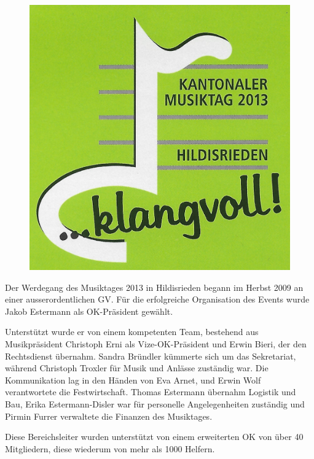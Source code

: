 \begin{history}

    \begin{figure}
        \includegraphics[width=\linewidth]{./chap/2001-2024/2013/Musiktag-Logo.jpg}
    \end{figure}

    Der Werdegang des Musiktages 2013 in Hildisrieden begann im Herbst 2009 an
    einer ausserordentlichen GV. Für die erfolgreiche Organisation des Events
    wurde \mbox{Jakob} \mbox{Estermann} als OK-Präsident gewählt.

    Unterstützt wurde er von einem kompetenten Team, bestehend aus
    Musikpräsident Christoph Erni als Vize-OK-Präsident und Erwin Bieri, der den
    Rechtsdienst übernahm. Sandra Bründler kümmerte sich um das Sekretariat,
    während Christoph Troxler für Musik und Anlässe zuständig war. Die
    Kommunikation lag in den Händen von Eva Arnet, und Erwin Wolf verantwortete
    die Festwirtschaft. Thomas Estermann übernahm Logistik und Bau, Erika
    Estermann-Disler war für personelle Angelegenheiten zuständig und Pirmin
    Furrer verwaltete die Finanzen des Musiktages.

    Diese Bereichsleiter wurden unterstützt von einem erweiterten OK von über 40
    Mitgliedern, diese wiederum von mehr als 1000 Helfern.


\end{history}
